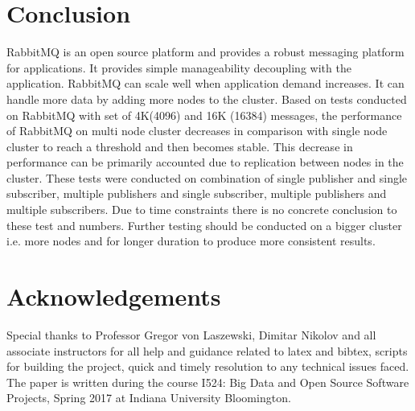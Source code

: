 \documentclass[9pt,twocolumn,twoside]{styles/osajnl}
\begin{document}
\section{Conclusion}
RabbitMQ is an open source platform and provides a robust messaging platform for
applications. It provides simple manageability decoupling with the application.
RabbitMQ can scale well when application demand increases. It can handle more
data by adding more nodes to the cluster. Based on tests
\cite{jones2011rabbitmq} conducted on RabbitMQ with set of 4K(4096) and 16K
(16384) messages, the performance of RabbitMQ on multi node cluster decreases in
comparison with single node cluster to reach a threshold and then becomes
stable. This decrease in performance can be primarily accounted due to
replication between nodes in the cluster. These tests were conducted on
combination of single publisher and single subscriber, multiple publishers and
single subscriber, multiple publishers and multiple subscribers. Due to time
constraints there is no concrete conclusion to these test and numbers. Further
testing should be conducted on a bigger cluster i.e. more nodes and for longer
duration to produce more consistent results.

\section*{Acknowledgements}
Special thanks to Professor Gregor von Laszewski, Dimitar Nikolov and all
associate instructors for all help and guidance related to latex and bibtex,
scripts for building the project, quick and timely resolution to any technical
issues faced. The paper is written during the course  {I524: Big Data and Open
Source Software Projects, Spring 2017} at Indiana University Bloomington.

\medskip

% 

\end{document}
